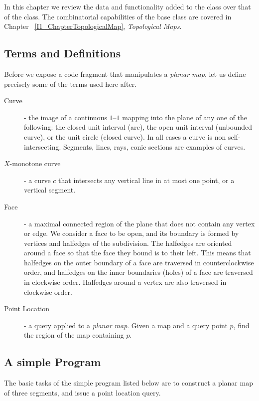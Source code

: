 In this chapter we review the data and functionality added
to the  class over that of the 
 class. The combinatorial capabilities of
the base class are covered in Chapter ~\ref{I1_ChapterTopologicalMap},
{\em Topological Maps}.

\subsection*{Terms and Definitions}
Before we expose a code fragment that manipulates a {\em planar
map}, let us define precisely some of the terms used here after.

\begin{description}
\item[Curve] - the image of a continuous $1$--$1$ mapping into the
plane of any one of the following: the closed unit interval (arc), the
open unit interval (unbounded curve), or the unit circle (closed
curve). In all cases a curve is non self-intersecting. Segments,
lines, rays, conic sections are examples of curves.

\item[{\boldmath $X$}-monotone curve] - a curve $c$ that intersects
any vertical line in at most one point, or a vertical segment.

\item[Face] - a maximal connected region of the plane that does not
contain any vertex or edge. We consider a face to be open, and its
boundary is formed by vertices and halfedges of the subdivision.
The halfedges are oriented around a face so that the face they bound 
is to their left. This means that halfedges on the outer boundary
of a face are traversed in counterclockwise order, and halfedges on
the inner boundaries (holes) of a face are traversed in clockwise
order. Halfedges around a vertex are also traversed in clockwise order. 

\item[Point Location] - a query applied to a {\em planar map}. Given a
map and a query point $p$, find the region of the map containing $p$.
\end{description}

\subsection*{A simple Program}
The basic tasks of the simple program listed below are to construct a
planar map of three segments, and issue a point location query.

